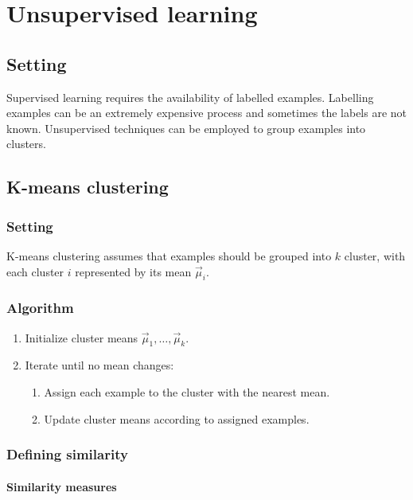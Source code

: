 \chapter{Unsupervised learning}

\section{Setting}
Supervised learning requires the availability of labelled examples.
Labelling examples can be an extremely expensive process and sometimes the labels are not known.
Unsupervised techniques can be employed to group examples into clusters.

\section{K-means clustering}

	\subsection{Setting}
	K-means clustering assumes that examples should be grouped into $k$ cluster, with each cluster $i$ represented by its mean $\vec{\mu}_i$.

	\subsection{Algorithm}

	\begin{enumerate}
		\item Initialize cluster means $\vec{\mu}_1,\dots,\vec{\mu}_k$.
		\item Iterate until no mean changes:
			\begin{enumerate}
				\item Assign each example to the cluster with the nearest mean.
				\item Update cluster means according to assigned examples.
			\end{enumerate}
	\end{enumerate}

	\subsection{Defining similarity}

		\subsubsection{Similarity measures}

